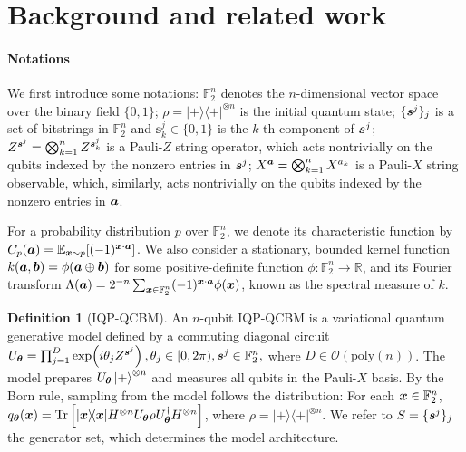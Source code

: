 \documentclass{article}
\theoremstyle{plain}
\theoremstyle{definition}
\newtheorem{definition}[theorem]{Definition}
\theoremstyle{remark}
\begin{document}


\section{Background and related work} \label{sec:background}
\paragraph{Notations} We first introduce some notations: $\mathbb{F}_2^n$ denotes the $n$-dimensional vector space over the binary field $\{0,1\}$; $\rho = |+\rangle\!\langle+|^{\otimes n}$ is the initial quantum state; $\{{\bm{s}^j}\}_j$ is a set of bitstrings in $\mathbb{F}_2^n$ and $\bm{s}_k^j\in\{0,1\}$ is the $k$-th component of ${\bm{s}^j}$; $Z^{{\bm{s}^j}} = \bigotimes_{k=1}^n Z^{\bm{s}_k^j}$ is a Pauli-$Z$ string operator, which acts nontrivially on the qubits indexed by the nonzero entries in ${\bm{s}^j}$; $X^{\bm{a}} = \bigotimes_{k=1}^n X^{a_k}$ is a Pauli-$X$ string observable, which, similarly, acts nontrivially on the qubits indexed by the nonzero entries in ${\bm{a}}$.

For a probability distribution $p$ over $\mathbb{F}_2^n$, we denote its characteristic function by $C_p({\bm{a}}) = \mathbb{E}_{{\bm{x}} \sim p}[(-1)^{{\bm{x}}\cdot {\bm{a}}}]$. We also consider a stationary, bounded kernel function $k({\bm{a}}, {\bm{b}}) = \phi({\bm{a}}\oplus{\bm{b}})$ for some positive-definite function $\phi\colon \mathbb{F}_2^n \to \mathbb{R}$, and its Fourier transform $\Lambda({\bm{a}}) = 2^{-n}\sum_{{\bm{x}}\in\mathbb{F}_2^n} (-1)^{{\bm{x}} \cdot {\bm{a}}} \phi({\bm{x}}) $, known as the spectral measure of $k$.
\begin{definition}[IQP-QCBM]
\label{def:IQP}
An $n$-qubit IQP-QCBM is a variational quantum generative model defined by a commuting diagonal circuit
$U_{{\bm{\theta}}}
=
\prod_{j=1}^D \exp\!\left(i\theta_j Z^{{\bm{s}}^j}\right),
\theta_j \in [0,2\pi), {\bm{s}}^j \in \mathbb F_2^n,$
where $D \in \mathcal O(\mathrm{poly}(n))$. The model prepares
$U_{{\bm{\theta}}}\ket{+}^{\otimes n}$ and measures all qubits in the Pauli-$X$ basis.
By the Born rule, sampling from the model follows the distribution: For each ${\bm{x}} \in \mathbb{F}_2^n$, $
q_{{\bm{\theta}}}({\bm{x}})
=
\operatorname{Tr}
\left[
|{\bm{x}}\rangle\!\langle{\bm{x}}|
H^{\otimes n}
U_{{\bm{\theta}}}\rho U_{{\bm{\theta}}}^{\dagger}
H^{\otimes n}
\right]$, where $\rho = |+\rangle\!\langle+|^{\otimes n}$.
We refer to $S=\{{\bm{s}^j}\}_j$ the generator set, which determines the model architecture.
\end{definition}
\end{document}
